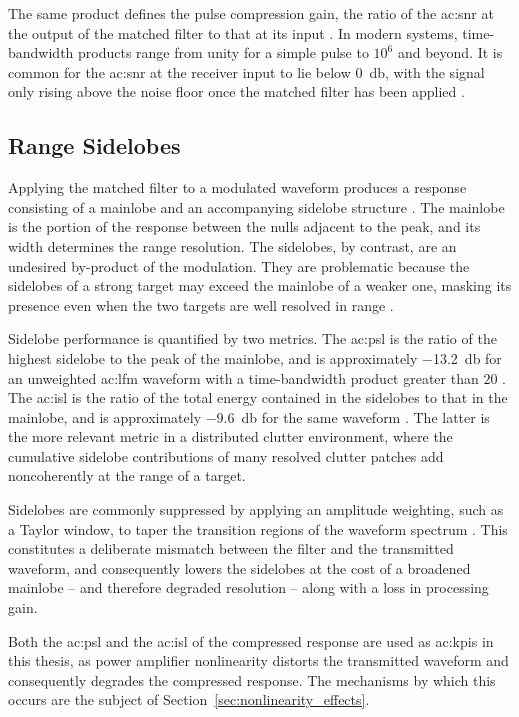 The same product defines the pulse compression gain, the ratio of the \gls{ac:snr} at the output of the matched filter to that at its input \cite{pomr}. In modern systems, time-bandwidth products range from unity for a simple pulse to $10^6$ and beyond. It is common for the \gls{ac:snr} at the receiver input to lie below \qty{0}{\decibel}, with the signal only rising above the noise floor once the matched filter has been applied \cite{pomr}.

\subsection{Range Sidelobes}\label{sec:range_sidelobes}

Applying the matched filter to a modulated waveform produces a response consisting of a mainlobe and an accompanying sidelobe structure \cite{pomr}. The mainlobe is the portion of the response between the nulls adjacent to the peak, and its width determines the range resolution. The sidelobes, by contrast, are an undesired by-product of the modulation. They are problematic because the sidelobes of a strong target may exceed the mainlobe of a weaker one, masking its presence even when the two targets are well resolved in range \cite{pomr}.

Sidelobe performance is quantified by two metrics. The \gls{ac:psl} is the ratio of the highest sidelobe to the peak of the mainlobe, and is approximately \qty{-13.2}{\decibel} for an unweighted \gls{ac:lfm} waveform with a time-bandwidth product greater than $20$ \cite{pomr}. The \gls{ac:isl} is the ratio of the total energy contained in the sidelobes to that in the mainlobe, and is approximately \qty{-9.6}{\decibel} for the same waveform \cite{pomr}. The latter is the more relevant metric in a distributed clutter environment, where the cumulative sidelobe contributions of many resolved clutter patches add noncoherently at the range of a target.

Sidelobes are commonly suppressed by applying an amplitude weighting, such as a Taylor window, to taper the transition regions of the waveform spectrum \cite{pomr}. This constitutes a deliberate mismatch between the filter and the transmitted waveform, and consequently lowers the sidelobes at the cost of a broadened mainlobe -- and therefore degraded resolution -- along with a loss in processing gain.

Both the \gls{ac:psl} and the \gls{ac:isl} of the compressed response are used as \glspl{ac:kpi} in this thesis, as power amplifier nonlinearity distorts the transmitted waveform and consequently degrades the compressed response. The mechanisms by which this occurs are the subject of Section~\ref{sec:nonlinearity_effects}.

